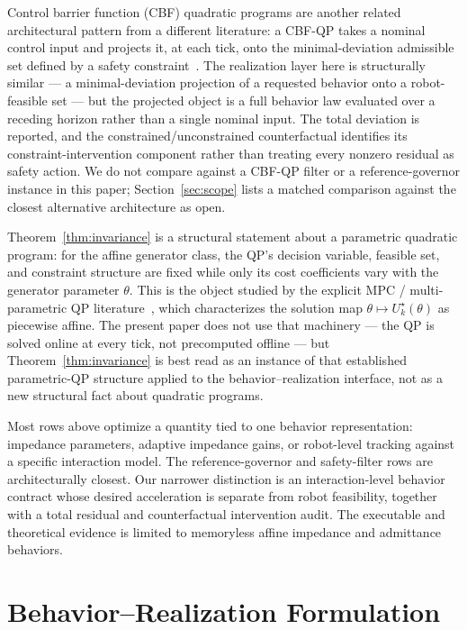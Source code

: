 \documentclass[journal]{IEEEtran}
\begin{document}
Control barrier function (CBF) quadratic programs are another related
architectural pattern from a different literature: a CBF-QP takes a
nominal control input and projects it, at each tick, onto the
minimal-deviation admissible set defined by a safety
constraint~\cite{ref10}. The realization layer here is structurally
similar --- a minimal-deviation projection of a requested behavior onto
a robot-feasible set --- but the projected object is a full behavior
law evaluated over a receding horizon rather than a single nominal
input. The total deviation is reported, and the constrained/unconstrained
counterfactual identifies its constraint-intervention component rather
than treating every nonzero residual as safety action. We do
not compare against a CBF-QP filter or a reference-governor instance in
this paper; Section~\ref{sec:scope} lists a matched comparison against
the closest alternative architecture as open.

Theorem~\ref{thm:invariance} is a structural statement about a
parametric quadratic program: for the affine generator class, the QP's
decision variable, feasible set, and constraint structure are fixed
while only its cost coefficients vary with the generator parameter
$\theta$. This is the object studied by the explicit MPC / multi-parametric
QP literature~\cite{ref11,ref12}, which characterizes the solution map
$\theta\mapsto U_k^\star(\theta)$ as piecewise affine. The present paper
does not use that machinery --- the QP is solved online at every tick,
not precomputed offline --- but Theorem~\ref{thm:invariance} is best
read as an instance of that established parametric-QP structure applied
to the behavior--realization interface, not as a new structural fact
about quadratic programs.

Most rows above optimize a quantity tied to one
behavior representation: impedance parameters, adaptive impedance gains,
or robot-level tracking against a specific interaction model. The
reference-governor and safety-filter rows are architecturally closest. Our narrower
distinction is an interaction-level behavior contract whose desired
acceleration is separate from robot feasibility, together with a total
residual and counterfactual intervention audit. The executable and theoretical
evidence is limited to memoryless affine impedance and admittance
behaviors.

\section{Behavior--Realization Formulation}
\label{sec:behaviors}
\end{document}
